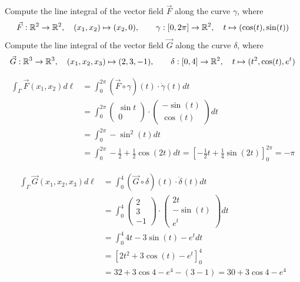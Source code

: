 \documentclass[11pt]{article}
\begin{document}




\begin{exercise}
    Compute the line integral of the vector field $\vec{F}$ along the curve $\gamma$, where 
    \begin{align*}
        \vec F : \mathbb{R}^2 \to \mathbb{R}^2, \quad (x_1,x_2) \mapsto ( x_2, 0 ), \qquad \gamma : [0,2\pi]  \to \mathbb{R}^2, \quad t \mapsto ( \cos(t), \sin(t) )
    \end{align*}
    Compute the line integral of the vector field $\vec{G}$ along the curve $\delta$, where 
    \begin{align*}
        \vec G : \mathbb{R}^3 \to \mathbb{R}^3, \quad (x_1,x_2,x_3) \mapsto ( 2, 3, -1 ), \qquad \delta : [0,4]  \to \mathbb{R}^2, \quad t \mapsto  ( t^2, \cos(t), e^t )
    \end{align*}
\end{exercise}
\begin{solution}
    \begin{align*}
        \int_{\Gamma} \vec{F}(x_1,x_2) d\ell 
        &= 
        \int_{0}^{2\pi} (\vec{F}\circ \gamma)(t)\cdot \dot{\gamma}(t)dt
        \\&= 
        \int_{0}^{2\pi} \begin{pmatrix}\sin t\\ 0\end{pmatrix}\cdot \begin{pmatrix} -\sin(t)\\ \cos(t)\end{pmatrix}dt
        \\&= 
        \int_{0}^{2\pi}  -\sin^2(t)dt
        \\&= 
        \int_{0}^{2\pi}  -\frac{1}{2}+\frac{1}{2}\cos(2t)dt
        = 
        \left[-\frac{1}{2}t + \frac{1}{4}\sin(2t)\right]_{0}^{2\pi} = -\pi
    \end{align*}

    \begin{align*}
        \int_{\Gamma} \vec{G}(x_1,x_2,x_3) d\ell &= \int_{0}^{4} (\vec{G}\circ \delta)(t)\cdot \dot{\delta}(t)dt
        \\&= \int_{0}^{4}\begin{pmatrix} 2\\ 3\\ -1\end{pmatrix} \cdot  \begin{pmatrix}2t\\ -\sin(t) \\ e^t \end{pmatrix}dt
        \\&= \int_{0}^{4} 4t - 3\sin(t) - e^t dt
        \\&= \left[2t^2 + 3\cos(t) - e^{t} \right]_{0}^{4}
        \\&= 32 + 3\cos4-e^4 - \left(3 - 1\right) = 30+3\cos4 -e^ 4
    \end{align*}
\end{solution}
\end{document}
